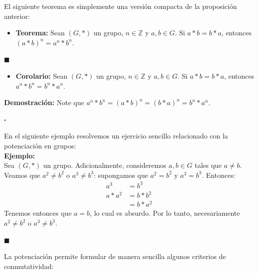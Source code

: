 \documentclass[10 pt]{article}
\begin{document}
\Large{El siguiente teorema es simplemente una versión compacta de la proposición anterior:} \\

\begin{itemize}
    \item \Large{\textbf{Teorema:} Sean $(G,*)$ un grupo, $n \in \mathbb Z$ y $a,b \in G$. Si $a*b=b*a$, entonces $(a*b)^n=a^n*b^n$.}
\end{itemize}

\begin{flushright}
    $\blacksquare$
\end{flushright}

\begin{itemize}
    \item \Large{\textbf{Corolario:} Sean $(G,*)$ un grupo, $n \in \mathbb Z$ y $a,b \in G$. Si $a*b=b*a$, entonces $a^n*b^n=b^n*a^n$.} \\
\end{itemize}

\Large{\textbf{Demostración:} Note que $a^n*b^n=(a*b)^n=(b*a)^n=b^n*a^n$.} \\

\begin{flushright}
    $\square$
\end{flushright}

\Large{En el siguiente ejemplo resolvemos un ejercicio sencillo relacionado con la potenciación en grupos:} \\

\Large{\textbf{Ejemplo:}} \\

\Large{Sea $(G,*)$ un grupo. Adicionalmente, consideremos $a,b \in G$ tales que $a \neq b$. Veamos que $a^2 \neq b^2$ o $a^3 \neq b^3$: supongamos que $a^2=b^2$ y $a^3=b^3$. Entonces:}
\begin{align*}
    a^3&=b^3 \\
    a*a^2&=b*b^2 \\
    &=b*a^2
\end{align*}
\Large{Tenemos entonces que $a=b$, lo cual es absurdo. Por lo tanto, necesariamente $a^2 \neq b^2$ o $a^3 \neq b^ 3$.} \\


\begin{flushright}
    $\blacksquare$
\end{flushright}

\Large{La potenciación permite formular de manera sencilla algunos criterios de conmutatividad:} \\
\end{document}

